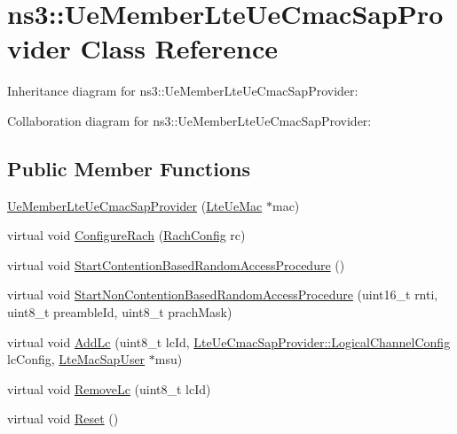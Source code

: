 \hypertarget{classns3_1_1UeMemberLteUeCmacSapProvider}{}\section{ns3\+:\+:Ue\+Member\+Lte\+Ue\+Cmac\+Sap\+Provider Class Reference}
\label{classns3_1_1UeMemberLteUeCmacSapProvider}


Inheritance diagram for ns3\+:\+:Ue\+Member\+Lte\+Ue\+Cmac\+Sap\+Provider\+:


Collaboration diagram for ns3\+:\+:Ue\+Member\+Lte\+Ue\+Cmac\+Sap\+Provider\+:
\subsection*{Public Member Functions}
\begin{DoxyCompactItemize}
\item 
\hyperlink{classns3_1_1UeMemberLteUeCmacSapProvider_af4accdbe9a3f893f0daae5018895b7d8}{Ue\+Member\+Lte\+Ue\+Cmac\+Sap\+Provider} (\hyperlink{classns3_1_1LteUeMac}{Lte\+Ue\+Mac} $\ast$mac)
\item 
virtual void \hyperlink{classns3_1_1UeMemberLteUeCmacSapProvider_a19d34d3f37ba06cf77a9e09c0827f43a}{Configure\+Rach} (\hyperlink{structns3_1_1LteUeCmacSapProvider_1_1RachConfig}{Rach\+Config} rc)
\item 
virtual void \hyperlink{classns3_1_1UeMemberLteUeCmacSapProvider_a6208f805f186807f4696669db0a428ee}{Start\+Contention\+Based\+Random\+Access\+Procedure} ()
\item 
virtual void \hyperlink{classns3_1_1UeMemberLteUeCmacSapProvider_ac9faae2f29511fa9f063fb7c45a7846b}{Start\+Non\+Contention\+Based\+Random\+Access\+Procedure} (uint16\+\_\+t rnti, uint8\+\_\+t preamble\+Id, uint8\+\_\+t prach\+Mask)
\item 
virtual void \hyperlink{classns3_1_1UeMemberLteUeCmacSapProvider_a84a9ceea1ef629c3d2c47199869e2ce7}{Add\+Lc} (uint8\+\_\+t lc\+Id, \hyperlink{structns3_1_1LteUeCmacSapProvider_1_1LogicalChannelConfig}{Lte\+Ue\+Cmac\+Sap\+Provider\+::\+Logical\+Channel\+Config} lc\+Config, \hyperlink{classns3_1_1LteMacSapUser}{Lte\+Mac\+Sap\+User} $\ast$msu)
\item 
virtual void \hyperlink{classns3_1_1UeMemberLteUeCmacSapProvider_a2475b76b1a4e88b24491b49719926065}{Remove\+Lc} (uint8\+\_\+t lc\+Id)
\item 
virtual void \hyperlink{classns3_1_1UeMemberLteUeCmacSapProvider_ab35571d910dd3d8539595cba0787ffb4}{Reset} ()
\end{DoxyCompactItemize}
